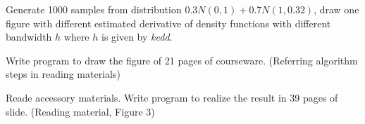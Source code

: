 \begin{problem}
    Generate 1000 samples from distribution $0.3N(0,1)+0.7N(1,0.32)$,  draw one figure with different estimated derivative of density functions with different bandwidth $h$ where $h$ is given by \emph{kedd}.
\end{problem}

\begin{problem}
    Write program to draw the figure of 21 pages of courseware.
    (Referring algorithm steps in reading materials)
\end{problem}

\begin{problem}
    Reade accessory materials. Write program to realize the result in 39 pages of slide. 
    (Reading material, Figure 3)
\end{problem}